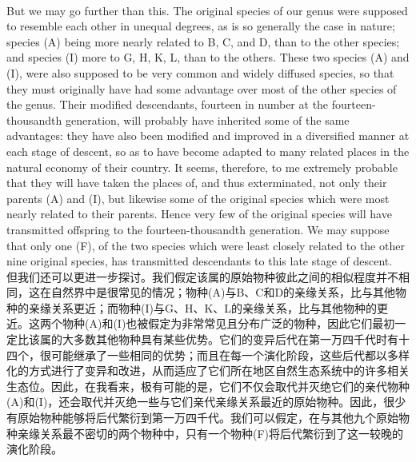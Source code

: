 \documentclass{article}
\begin{document}
\\
But we may go further than this. The original species of our genus were supposed to resemble each other in unequal degrees, as is so generally the case in nature; species (A) being more nearly related to B, C, and D, than to the other species; and species (I) more to G, H, K, L, than to the others. These two species (A) and (I), were also supposed to be very common and widely diffused species, so that they must originally have had some advantage over most of the other species of the genus. Their modified descendants, fourteen in number at the fourteen-thousandth generation, will probably have inherited some of the same advantages: they have also been modified and improved in a diversified manner at each stage of descent, so as to have become adapted to many related places in the natural economy of their country. It seems, therefore, to me extremely probable that they will have taken the places of, and thus exterminated, not only their parents (A) and (I), but likewise some of the original species which were most nearly related to their parents. Hence very few of the original species will have transmitted offspring to the fourteen-thousandth generation. We may suppose that only one (F), of the two species which were least closely related to the other nine original species, has transmitted descendants to this late stage of descent.\\
但我们还可以更进一步探讨。我们假定该属的原始物种彼此之间的相似程度并不相同，这在自然界中是很常见的情况；物种(A)与B、C和D的亲缘关系，比与其他物种的亲缘关系更近；而物种(I)与G、H、K、L的亲缘关系，比与其他物种的更近。这两个物种(A)和(I)也被假定为非常常见且分布广泛的物种，因此它们最初一定比该属的大多数其他物种具有某些优势。它们的变异后代在第一万四千代时有十四个，很可能继承了一些相同的优势；而且在每一个演化阶段，这些后代都以多样化的方式进行了变异和改进，从而适应了它们所在地区自然生态系统中的许多相关生态位。因此，在我看来，极有可能的是，它们不仅会取代并灭绝它们的亲代物种(A)和(I)，还会取代并灭绝一些与它们亲代亲缘关系最近的原始物种。因此，很少有原始物种能够将后代繁衍到第一万四千代。我们可以假定，在与其他九个原始物种亲缘关系最不密切的两个物种中，只有一个物种(F)将后代繁衍到了这一较晚的演化阶段。\\ 
\end{document}
